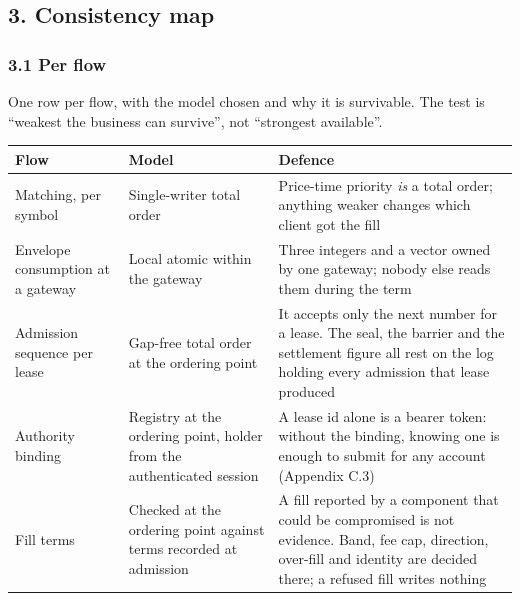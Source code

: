 \documentclass[10pt,a4paper]{article}
\newcounter{none}  %
\begin{document}
\label{start:4}%

\subsection{3. Consistency map}\label{consistency-map}

\subsubsection{3.1 Per flow}\label{per-flow}

One row per flow, with the model chosen and why it is survivable. The test is
``weakest the business can survive'', not ``strongest available''.

{\def\LTcaptype{none} %
\begin{longtable}[]{@{}
  >{\raggedright\arraybackslash}p{}
  >{\raggedright\arraybackslash}p{}
  >{\raggedright\arraybackslash}p{}@{}}
\toprule\noalign{}
\begin{minipage}[b]{\linewidth}\raggedright
Flow
\end{minipage} & \begin{minipage}[b]{\linewidth}\raggedright
Model
\end{minipage} & \begin{minipage}[b]{\linewidth}\raggedright
Defence
\end{minipage} \\
\midrule\noalign{}
\endhead
\bottomrule\noalign{}
\endlastfoot
Matching, per symbol & Single-writer total order & Price-time priority \emph{is} a total order; anything weaker changes which client got the fill \\
Envelope consumption at a gateway & Local atomic within the gateway & Three integers and a vector owned by one gateway; nobody else reads them during the term \\
Admission sequence per lease & Gap-free total order at the ordering point & It accepts only the next number for a lease. The seal, the barrier and the settlement figure all rest on the log holding every admission that lease produced \\
Authority binding & Registry at the ordering point, holder from the authenticated session & A lease id alone is a bearer token: without the binding, knowing one is enough to submit for any account (Appendix C.3) \\
Fill terms & Checked at the ordering point against terms recorded at admission & A fill reported by a component that could be compromised is not evidence. Band, fee cap, direction, over-fill and identity are decided there; a refused fill writes nothing \\

\end{longtable}}
\end{document}
